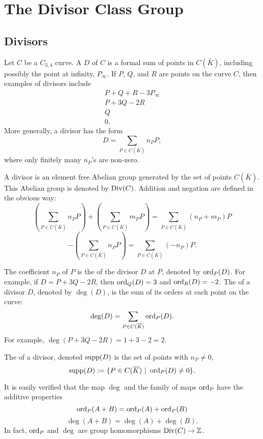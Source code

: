 
\section{The Divisor Class Group}
\label{chap_divisors}



\subsection{Divisors}

Let $C$ be a $C_{3,4}$ curve.
A  $D$ of $C$ is a formal sum of points in $C(\bar K)$,
including possibly the point at infinity, $P_\infty$.
If $P$, $Q$, and $R$ are points on the curve $C$, then examples of divisors include
  \[ \begin{array}{c} P + Q + R - 3P_\infty \\ P + 3Q - 2R \\ Q \\ 0. \end{array} \]
More generally, a divisor has the form
  \[ D = \sum_{P \in C(\bar K)} n_P P,\]
where only finitely many $n_P$'s are non-zero.

A divisor is an element free Abelian group generated by the set of points $C(\bar K)$.
This Abelian group is denoted by $\operatorname{Div}(C)$.
Addition and negation are defined in the obvious way:
\[ \left( \sum_{P \in C(\bar K)} n_P P \right) + \left( \sum_{P \in C(\bar K)} m_P P \right) = \sum_{P \in C(\bar K)} (n_P + m_P) P \]
\[ -\left( \sum_{P \in C(\bar K)} n_P P \right) = \sum_{P \in C(\bar K)} (-n_P) P. \]

The coefficient $n_P$ of $P$ is the  of the divisor $D$ at $P$, denoted by $\operatorname{ord}_P(D)$.
For example, if $D = P + 3Q - 2R$, then $\operatorname{ord}_Q(D) = 3$ and $\operatorname{ord}_R(D) = -2$.
The  of a divisor $D$, denoted by $\deg(D)$, is the sum of its orders at each point on the curve:
  \[ \deg(D) = \sum_{P \in C(\overline K)} \operatorname{ord}_P(D). \]
For example, $\deg(P + 3Q - 2R) = 1 + 3 - 2 = 2$.

The  of a divisor, denoted $\operatorname{supp}(D)$ is the set of points with $n_P \neq 0$,
\[ \operatorname{supp}(D) := \{ P \in C(\overline K) ~|~ \operatorname{ord}_P(D) \neq 0 \}. \]

It is easily verified that the map $\deg$ and the family of maps $\operatorname{ord}_P$ have the additive properties
  \[ \operatorname{ord}_P(A + B) = \operatorname{ord}_P(A) + \operatorname{ord}_P(B) \]
  \[ \deg(A + B) = \deg(A) + \deg(B). \]
In fact, $\operatorname{ord}_P$ and $\deg$ are group homomorphisms $\operatorname{Div}(C) \to \mathbb{Z}$.


